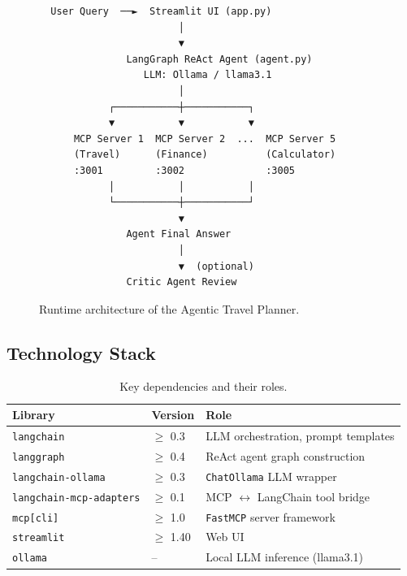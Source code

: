 \documentclass[12pt,a4paper]{article}
\begin{document}
\begin{figure}[H]
\centering
\begin{tcolorbox}[colback=white,colframe=codegray!50,width=0.95\textwidth,arc=4pt]
\begin{verbatim}
  User Query  ──►  Streamlit UI (app.py)
                        │
                        ▼
               LangGraph ReAct Agent (agent.py)
                  LLM: Ollama / llama3.1
                        │
            ┌───────────┼───────────┐
            ▼           ▼           ▼
      MCP Server 1  MCP Server 2  ...  MCP Server 5
      (Travel)      (Finance)          (Calculator)
      :3001         :3002              :3005
            │           │           │
            └───────────┼───────────┘
                        ▼
               Agent Final Answer
                        │
                        ▼  (optional)
               Critic Agent Review
\end{verbatim}
\end{tcolorbox}
\caption{Runtime architecture of the Agentic Travel Planner.}
\label{fig:arch}
\end{figure}

\subsection{Technology Stack}

\begin{table}[H]
\centering
\caption{Key dependencies and their roles.}
\label{tab:deps}
\begin{tabular}{@{}llp{7cm}@{}}
\toprule
\textbf{Library} & \textbf{Version} & \textbf{Role} \\
\midrule
\texttt{langchain}             & $\geq$ 0.3  & LLM orchestration, prompt templates \\
\texttt{langgraph}             & $\geq$ 0.4  & ReAct agent graph construction \\
\texttt{langchain-ollama}      & $\geq$ 0.3  & \texttt{ChatOllama} LLM wrapper \\
\texttt{langchain-mcp-adapters}& $\geq$ 0.1  & MCP $\leftrightarrow$ LangChain tool bridge \\
\texttt{mcp[cli]}              & $\geq$ 1.0  & \texttt{FastMCP} server framework \\
\texttt{streamlit}             & $\geq$ 1.40 & Web UI \\
\texttt{ollama}                & --           & Local LLM inference (llama3.1) \\
\bottomrule
\end{tabular}
\end{table}
\end{document}
